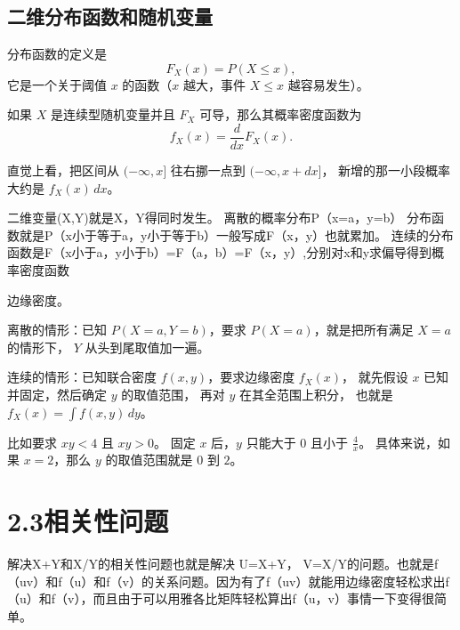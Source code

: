 \subsection*{二维分布函数和随机变量}
\begin{note}
    分布函数的定义是
\[
F_X(x)=P(X\le x),
\]
它是一个关于阈值 $x$ 的函数（$x$ 越大，事件 $X\le x$ 越容易发生）。

如果 $X$ 是连续型随机变量并且 $F_X$ 可导，那么其概率密度函数为
\[
f_X(x)=\frac{d}{dx}F_X(x).
\]

直觉上看，把区间从 $(-\infty,x]$ 往右挪一点到 $(-\infty,x+dx]$，
新增的那一小段概率大约是
$f_X(x)\,dx$。
\end{note}
\begin{note}
二维变量(X,Y)就是X，Y得同时发生。
离散的概率分布P（x=a，y=b）
分布函数就是P（x小于等于a，y小于等于b）一般写成F（x，y）也就累加。
连续的分布函数是F（x小于a，y小于b）=F（a，b）=F（x，y）,分别对x和y求偏导得到概率密度函数
\end{note}
\begin{note}
   边缘密度。

离散的情形：已知 $P(X=a,Y=b)$，要求 $P(X=a)$，就是把所有满足 $X=a$ 的情形下，
$Y$ 从头到尾取值加一遍。

连续的情形：已知联合密度 $f(x,y)$，要求边缘密度 $f_X(x)$，
就先假设 $x$ 已知并固定，然后确定 $y$ 的取值范围，
再对 $y$ 在其全范围上积分，
也就是
$f_X(x)=\int f(x,y)\,dy$。

比如要求 $xy<4$ 且 $xy>0$。
固定 $x$ 后，$y$ 只能大于 $0$ 且小于 $\frac{4}{x}$。
具体来说，如果 $x=2$，那么 $y$ 的取值范围就是 $0$ 到 $2$。
\end{note}
\section*{2.3相关性问题}
\begin{note}
    解决X+Y和X/Y的相关性问题也就是解决
    U=X+Y， V=X/Y的问题。也就是f（uv）和f（u）和f（v）的关系问题。因为有了f（uv）就能用边缘密度轻松求出f（u）和f（v），而且由于可以用雅各比矩阵轻松算出f（u，v）事情一下变得很简单。
\end{note}
